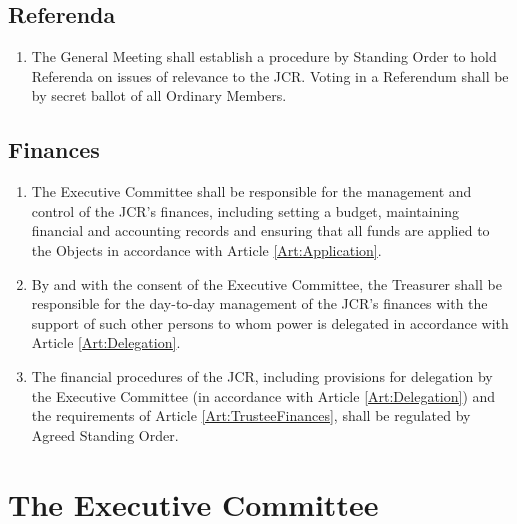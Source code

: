 \documentclass[11pt,a4paper, oneside]{memoir}
\begin{document}
	\section{Referenda} \label{Art:Referenda}
	\begin{enumerate}
		\item The General Meeting shall establish a procedure by Standing Order to hold Referenda on issues of relevance to the JCR.  Voting in a Referendum shall be by secret ballot of all Ordinary Members.
	\end{enumerate}
	\section{Finances} \label{Art:Finances}
	\begin{enumerate}
		\item The Executive Committee shall be responsible for the management and control of the JCR's finances, including setting a budget, maintaining financial and accounting records and ensuring that all funds are applied to the Objects in accordance with Article \ref{Art:Application}.
		\item By and with the consent of the Executive Committee, the Treasurer shall be responsible for the day-to-day management of the JCR's finances with the support of such other persons to whom power is delegated in accordance with Article \ref{Art:Delegation}.
		\item The financial procedures of the JCR, including provisions for delegation by the Executive Committee (in accordance with Article \ref{Art:Delegation}) and the requirements of Article \ref{Art:TrusteeFinances}, shall be regulated by Agreed Standing Order.
	\end{enumerate}
	\chapter{The Executive Committee}
\end{document}
